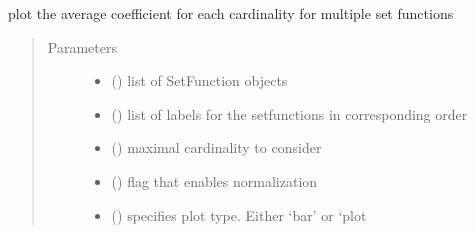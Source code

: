 \documentclass[letterpaper,10pt,english]{sphinxmanual}
\begin{document}
\begin{fulllineitems}
\label{\detokenize{setFTs:setFTs.plotting.plot_spectral_energy_multi}}
\sphinxAtStartPar
plot the average coefficient for each cardinality for multiple set functions
\begin{quote}\begin{description}
\item[{Parameters}] \leavevmode\begin{itemize}
\item {} 
\sphinxAtStartPar
{} (\sphinxstyleliteralemphasis{\sphinxupquote{{[}}}\sphinxstyleliteralemphasis{\sphinxupquote{{]}}}) \textendash{} list of SetFunction objects

\item {} 
\sphinxAtStartPar
{} (\sphinxstyleliteralemphasis{\sphinxupquote{{[}}}\sphinxstyleliteralemphasis{\sphinxupquote{{]}}}) \textendash{} list of labels for the setfunctions in corresponding order

\item {} 
\sphinxAtStartPar
{} () \textendash{} maximal cardinality to consider

\item {} 
\sphinxAtStartPar
{} () \textendash{} flag that enables normalization

\item {} 
\sphinxAtStartPar
{} () \textendash{} specifies plot type. Either ‘bar’ or ‘plot

\end{itemize}

\end{description}\end{quote}

\end{fulllineitems}
\end{document}
